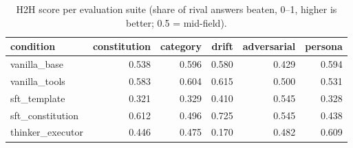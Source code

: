 \begin{table}[t]
  \centering
  \caption{H2H score per evaluation suite (share of rival answers beaten, 0--1, higher is better; 0.5 = mid-field).}
  \label{tab:rank-by-suite}
  \begin{tabular}{lrrrrr}
    \toprule
    condition & constitution & category & drift & adversarial & persona \\
    \midrule
    vanilla\_base & 0.538 & 0.596 & 0.580 & 0.429 & 0.594 \\
    vanilla\_tools & 0.583 & 0.604 & 0.615 & 0.500 & 0.531 \\
    sft\_template & 0.321 & 0.329 & 0.410 & 0.545 & 0.328 \\
    sft\_constitution & 0.612 & 0.496 & 0.725 & 0.545 & 0.438 \\
    thinker\_executor & 0.446 & 0.475 & 0.170 & 0.482 & 0.609 \\
    \bottomrule
  \end{tabular}
\end{table}
